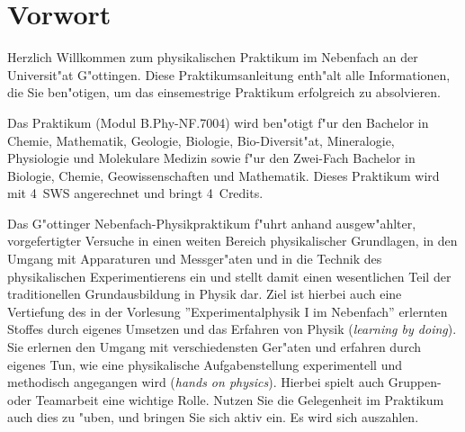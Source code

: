 

\chapter*{Vorwort}



Herzlich Willkommen zum physikalischen Praktikum im Nebenfach an der Universit"at
G"ottingen. Diese Praktikumsanleitung enth"alt alle Informationen, die Sie ben"otigen, um das einsemestrige Praktikum erfolgreich zu absolvieren.

Das Praktikum (Modul B.Phy-NF.7004) wird ben"otigt f"ur den Bachelor in Chemie, Mathematik, Geologie, Biologie, Bio-Diversit"at, Mineralogie, Physiologie und Molekulare Medizin sowie f"ur den Zwei-Fach Bachelor in Biologie, Chemie, Geowissenschaften und Mathematik. Dieses Praktikum wird mit 4~SWS angerechnet und bringt 4~Credits.


Das G"ottinger Nebenfach-Physikpraktikum f"uhrt anhand ausgew"ahlter, vorgefertigter Versuche
in einen weiten Bereich physikalischer Grundlagen, in den Umgang mit
Apparaturen und Messger"aten und in die Technik des physikalischen
Experimentierens ein und stellt damit einen wesentlichen Teil der
traditionellen Grundausbildung in Physik dar. Ziel ist hierbei auch 
eine Vertiefung des
in der Vorlesung ''Experimentalphysik I im Nebenfach'' erlernten Stoffes durch eigenes Umsetzen
und das Erfahren von Physik (\textit{learning by doing}). Sie erlernen
den Umgang mit verschiedensten Ger"aten und erfahren durch eigenes
Tun, wie eine physikalische Aufgabenstellung experimentell und
methodisch angegangen wird (\textit{hands on physics}). %
Hierbei spielt auch Gruppen- oder Teamarbeit eine wichtige Rolle.
Nutzen Sie die Gelegenheit im Praktikum auch dies zu "uben, und
bringen Sie sich aktiv ein. Es wird sich auszahlen.

